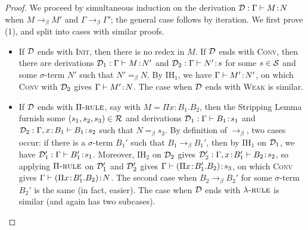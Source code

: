 \documentclass[reqno, twoside]{article}
\begin{document}
    \begin{proof}
        We proceed by simultaneous induction on the derivation $\mathcal{D}:\Gamma\vdash M\!:\!N$ when $M\rightarrow_\beta M'$ and $\Gamma\rightarrow_\beta\Gamma'$; the general case follows by iteration. We first prove (1), and split into cases with similar proofs.
        \begin{itemize}\small\vspace{-0.05in}
            \item If $\mathcal{D}$ ends with \textsc{Init}, then there is no redex in $M$. If $\mathcal{D}$ ends with \textsc{Conv}, then there are derivations $\mathcal{D}_1:\Gamma\vdash M\!:\!N'$ and $\mathcal{D}_2:\Gamma\vdash N'\!:\! s$ for some $s\in\mathcal{S}$ and some $\sigma$-term $N'$ such that $N'=_\beta N$. By $\mathrm{IH}_1$, we have $\Gamma\vdash M'\!:\!N'$, on which \textsc{Conv} with $\mathcal{D}_2$ gives $\Gamma\vdash M'\!:\!N$. The case when $\mathcal{D}$ ends with \textsc{Weak} is similar.
                \vspace{-0.05in}
            \item If $\mathcal{D}$ ends with $\Pi{\normalfont\textsc{-rule}}$, say with $M=\Pi x\!:\!B_1.B_2$, then the Stripping Lemma furnish some $(s_1,s_2,s_3)\in\mathcal{R}$ and derivations $\mathcal{D}_1:\Gamma\vdash B_1\!:\!s_1$ and $\mathcal{D}_2:\Gamma,x\!:\!B_1\vdash B_1\!:\!s_2$ such that $N=_\beta s_3$. By definition of $\rightarrow_\beta$, two cases occur: if there is a $\sigma$-term $B_1'$ such that $B_1\rightarrow_\beta B_1'$, then by $\mathrm{IH}_1$ on $\mathcal{D}_1$, we have $\mathcal{D}'_1:\Gamma\vdash B_1'\!:\!s_1$. Moreover, $\mathrm{IH}_2$ on $\mathcal{D}_2$ gives $\mathcal{D}'_2:\Gamma,x\!:\!B_1'\vdash B_2\!:\!s_2$, so applying $\Pi{\normalfont\textsc{-rule}}$ on $\mathcal{D}'_1$ and $\mathcal{D}'_2$ gives $\Gamma\vdash(\Pi x\!:\!B_1'.B_2)\!:\!s_3$, on which \textsc{Conv} gives $\Gamma\vdash(\Pi x\!:\!B_1'.B_2)\!:\!N$. The second case when $B_2\rightarrow_\beta B_2'$ for some $\sigma$-term $B_2'$ is the same (in fact, easier). The case when $\mathcal{D}$ ends with $\lambda{\normalfont\textsc{-rule}}$ is similar (and again has two subcases).
                \vspace{-0.05in}

\end{itemize}
\end{proof}
\end{document}
